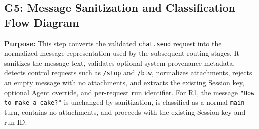 
\subsection*{G5: Message Sanitization and Classification Flow Diagram}

\textbf{Purpose:}
This step converts the validated \texttt{chat.send} request into the
normalized message representation used by the subsequent routing stages.
It sanitizes the message text, validates optional system provenance
metadata, detects control requests such as \texttt{/stop} and
\texttt{/btw}, normalizes attachments, rejects an empty message with no
attachments, and extracts the existing Session key, optional Agent
override, and per-request run identifier. For R1, the message
\texttt{"How to make a cake?"} is unchanged by sanitization, is classified
as a normal \texttt{main} turn, contains no attachments, and proceeds
with the existing Session key and run ID.

